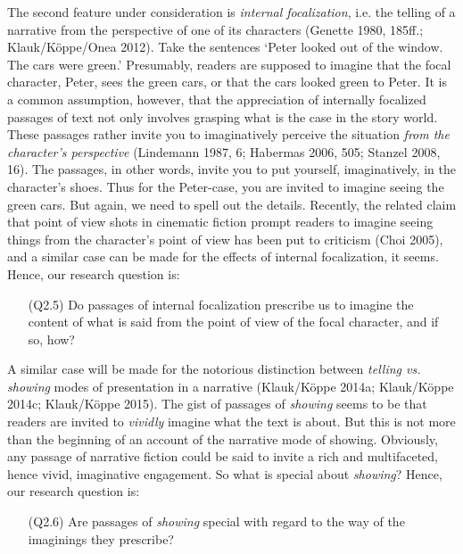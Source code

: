 \noindent The second feature under consideration is \emph{internal focalization}, i.e. the telling of a narrative from the perspective of one of its characters (Genette 1980, 185ff.; Klauk/K\"oppe/Onea 2012). Take the sentences `Peter looked out of the window. The cars were green.' Presumably, readers are supposed to imagine that the focal character, Peter, sees the green cars, or that the cars looked green to Peter. It is a common assumption, however, that the appreciation of internally focalized passages of text not only involves grasping what is the case in the story world. These passages rather invite you to imaginatively perceive the situation \emph{from the character's perspective} (Lindemann 1987, 6; Habermas 2006, 505; Stanzel 2008, 16). The passages, in other words, invite you to put yourself, imaginatively, in the character's shoes. Thus for the Peter-case, you are invited to
imagine seeing the green cars. But again, we need to spell out the details. Recently, the related claim that point of view shots in cinematic fiction prompt readers to imagine seeing things from the character's point of view has been put to criticism (Choi 2005), and a similar case can be made for the effects of internal focalization, it seems. Hence, our research question is:

\vspace{-.1cm}
\begin{itemize}[leftmargin=2cm]
\item[(Q2.5)] Do passages of internal focalization prescribe us to imagine the content of what is said from  the point of view of the focal character, and if so, how? 
\end{itemize}
\vspace{-.1cm}

\noindent A similar case will be made for the notorious distinction between \emph{telling vs. showing} modes of presentation in a narrative (Klauk/K\"oppe 2014a; Klauk/K\"oppe 2014c; Klauk/K\"oppe 2015). The gist of passages of \emph{showing} seems to be that readers are invited to \emph{vividly} imagine what the text is about. But this is not more than the beginning of an account of the narrative mode of showing. Obviously, any passage of narrative fiction could be said to invite a rich and multifaceted, hence vivid, imaginative engagement. So what is special about \emph{showing}? Hence, our research question is:

\vspace{-.1cm}
\begin{itemize}[leftmargin=2cm]
\item[(Q2.6)] Are passages of \emph{showing} special with regard to the way of the imaginings they prescribe? 
\end{itemize}
\vspace{-.1cm}

